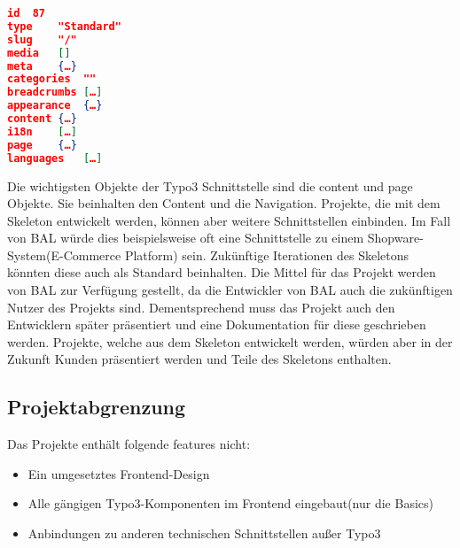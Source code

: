 \begin{lstlisting}[language=json,firstnumber=1]
id	87
type	"Standard"
slug	"/"
media	[]
meta	{…}
categories	""
breadcrumbs	[…]
appearance	{…}
content	{…}
i18n	[…]
page	{…}
languages	[…]
\end{lstlisting}
Die wichtigsten Objekte der Typo3 Schnittstelle sind die content und page Objekte. Sie beinhalten den Content und die Navigation.
Projekte, die mit dem Skeleton entwickelt werden, können aber weitere Schnittstellen einbinden. Im Fall von \acs{BAL} würde dies beispielsweise oft eine Schnittstelle zu einem Shopware-System(E-Commerce Platform) sein. Zukünftige Iterationen des Skeletons könnten diese auch als Standard beinhalten.
Die Mittel für das Projekt werden von  \acs{BAL} zur Verfügung gestellt, da die Entwickler von \acs{BAL} auch die zukünftigen Nutzer des Projekts sind. Dementsprechend muss das Projekt auch den Entwicklern später präsentiert und eine Dokumentation für diese geschrieben werden. Projekte, welche aus dem Skeleton entwickelt werden, würden aber in der Zukunft Kunden präsentiert werden und Teile des Skeletons enthalten.


\subsection{Projektabgrenzung} 
\label{sec:Projektabgrenzung}

Das Projekte enthält folgende features nicht:

\begin{itemize}
	\item Ein umgesetztes Frontend-Design
	\item Alle gängigen Typo3-Komponenten im Frontend eingebaut(nur die Basics)
	\item Anbindungen zu anderen technischen Schnittstellen außer Typo3
\end{itemize}
